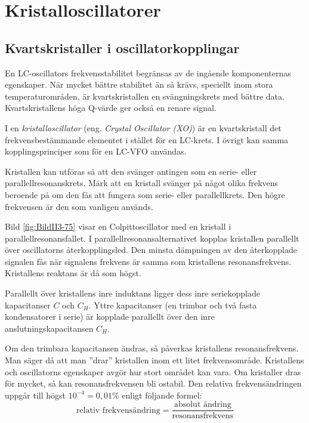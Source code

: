 \section{Kristalloscillatorer}
\label{kristalloscillator}

\subsection{Kvartskristaller i oscillator\-kopplingar}

En LC-oscillators frekvensstabilitet begränsas av de ingående
komponenternas egenskaper.
När mycket bättre stabilitet än så krävs, speciellt inom stora
temperaturområden, är kvartskristallen en svängningskrets med bättre data.
Kvartskristallens höga Q-värde ger också en renare signal.


I en \emph{kristalloscillator} (eng. \emph{Crystal Oscillator (XO)}) är en
kvartskristall det frekvensbestämmande elementet i stället för en LC-krets.
I övrigt kan samma kopplingsprinciper som för en LC-VFO användas.

Kristallen kan utföras så att den svänger antingen som en serie- eller
parallellresonanskrets.
Märk att en kristall svänger på något olika frekvens beroende på om den fås
att fungera som serie- eller parallellkrets.
Den högre frekvensen är den som vanligen används.

Bild \ref{fig:BildII3-75} visar en Colpittoscillator med en kristall i
parallellresonansfallet.
I parallellresonansalternativet kopplas kristallen parallellt över
oscillatorns återkopplingsled.
Den minsta dämpningen av den återkopplade signalen fås när signalens frekvens
är samma som kristallens resonansfrekvens.
Kristallens reaktans är då som högst.

Parallellt över kristallens inre induktans ligger dess inre
seriekopplade kapacitanser \(C\) och \(C_H\).
Yttre kapacitanser (en trimbar och två fasta kondensatorer i serie) är kopplade
parallellt över den inre anslutningskapacitansen \(C_H\).

Om den trimbara kapacitansen ändras, så påverkas kristallens resonansfrekvens.
Man säger då att man ''drar'' kristallen inom ett litet frekvensområde.
Kristallens och oscillatorns egenskaper avgör hur stort området kan vara.
Om kristaller dras för mycket, så kan resonansfrekvensen bli ostabil.
Den relativa frekvensändringen uppgår till högst \(10^{-4} = 0,01\%\)
enligt följande formel:
%
\[
\text{relativ frekvensändring} =
\frac{\text{absolut ändring}}{\text{resonansfrekvens}}
\]

